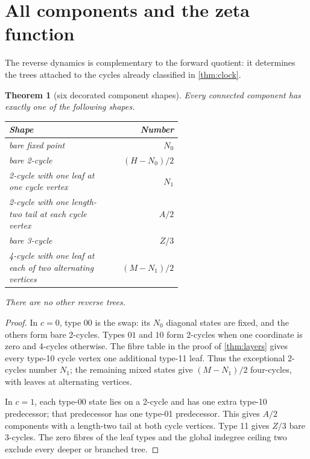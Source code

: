 \documentclass[10pt,a4paper]{amsart}
\newtheorem{theorem}{Theorem}[section]
\theoremstyle{definition}
\theoremstyle{remark}
\numberwithin{equation}{section}
\begin{document}
\section{All components and the zeta function}

The reverse dynamics is complementary to the forward quotient: it determines
the trees attached to the cycles already classified in \cref{thm:clock}.

\begin{theorem}[six decorated component shapes]\label{thm:components}
Every connected component has exactly one of the following shapes.
\begin{center}
\small
\begin{tabular}{@{}p{0.57\linewidth}r@{}}
\toprule
Shape & Number\\
\midrule
bare fixed point & \(N_0\)\\
bare 2-cycle & \((H-N_0)/2\)\\
2-cycle with one leaf at one cycle vertex & \(N_1\)\\
2-cycle with one length-two tail at each cycle vertex & \(A/2\)\\
bare 3-cycle & \(Z/3\)\\
4-cycle with one leaf at each of two alternating vertices & \((M-N_1)/2\)\\
\bottomrule
\end{tabular}
\end{center}
There are no other reverse trees.
\end{theorem}

\begin{proof}
In \(c=0\), type \(00\) is the swap: its \(N_0\) diagonal states are fixed,
and the others form bare 2-cycles.  Types \(01\) and \(10\) form 2-cycles
when one coordinate is zero and 4-cycles otherwise.  The fibre table in the
proof of \cref{thm:layers} gives every type-10 cycle vertex one additional
type-11 leaf.  Thus the exceptional 2-cycles number \(N_1\); the remaining
mixed states give \((M-N_1)/2\) four-cycles, with leaves at alternating
vertices.

In \(c=1\), each type-00 state lies on a 2-cycle and has one extra type-10
predecessor; that predecessor has one type-01 predecessor.  This gives
\(A/2\) components with a length-two tail at both cycle vertices.  Type 11
gives \(Z/3\) bare 3-cycles.  The zero fibres of the leaf types and the global
indegree ceiling two exclude every deeper or branched tree.
\end{proof}
\end{document}
